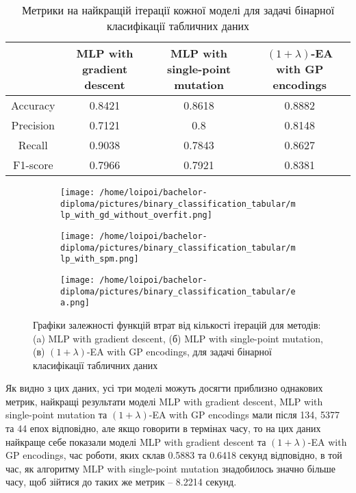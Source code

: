 \begin{table}[ht]
	\centering
	\begin{adjustbox}{max width=\textwidth}
		\begin{tabular}{|c|c|c|c|}
			\hline 
			 & MLP with gradient descent & MLP with single-point mutation & $(1+\lambda)$-EA with GP encodings \\
			\hline 
			Accuracy & 0.8421 & 0.8618 & 0.8882 \\
			\hline 
			Precision & 0.7121 & 0.8 & 0.8148 \\
			\hline
			Recall & 0.9038 & 0.7843 & 0.8627 \\
			\hline
			F1-score & 0.7966 & 0.7921 & 0.8381 \\
			\hline
		\end{tabular}
	\end{adjustbox}
	\caption{Метрики на найкращій ітерації кожної моделі для задачі бінарної класифікації табличних даних}
	\label{metrics_bc_td_results}
\end{table}

\begin{figure}[ht]
	\centering
	\begin{subfigure}[b]{0.32\textwidth}    
		\texttt{[image: /home/loipoi/bachelor-diploma/pictures/binary\_classification\_tabular/mlp\_with\_gd\_without\_overfit.png]}
		\caption{}
	\end{subfigure}
	\begin{subfigure}[b]{0.32\textwidth}
		\texttt{[image: /home/loipoi/bachelor-diploma/pictures/binary\_classification\_tabular/mlp\_with\_spm.png]}
		\caption{}
	\end{subfigure}	
	\begin{subfigure}[b]{0.32\textwidth}
		\texttt{[image: /home/loipoi/bachelor-diploma/pictures/binary\_classification\_tabular/ea.png]}
		\caption{}
	\end{subfigure}
	
	\caption{Графіки залежності функцій втрат від кількості ітерацій для методів: (a) MLP with gradient descent, (б) MLP with single-point mutation, (в) $(1+\lambda)$-EA with GP encodings, для задачі бінарної класифікації табличних даних}
	\label{fig_losses_bc_td}
\end{figure}

Як видно з цих даних, усі три моделі можуть досягти приблизно однакових метрик, найкращі результати моделі MLP with gradient descent, MLP with single-point mutation та $(1+\lambda)$-EA with GP encodings мали після 134, 5377 та 44 епох відповідно, але якщо говорити в термінах часу, то на цих даних найкраще себе показали моделі MLP with gradient descent та $(1+\lambda)$-EA with GP encodings, час роботи, яких склав 0.5883 та 0.6418 секунд відповідно, в той час, як алгоритму MLP with single-point mutation знадобилось значно більше часу, щоб зійтися до таких же метрик -- 8.2214 секунд.

